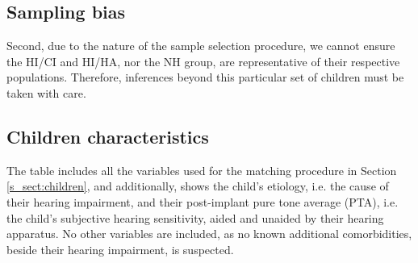 \subsection{Sampling bias}
%
Second, due to the nature of the sample selection procedure, we cannot ensure the HI/CI and HI/HA, nor the NH group, are representative of their respective populations. Therefore, inferences beyond this particular set of children must be taken with care.
%
%

\subsection{Children characteristics} \label{appA:char}
%
The table includes all the variables used for the matching procedure in Section \ref{s_sect:children}, and additionally, shows the child's etiology, i.e. the cause of their hearing impairment, and their post-implant pure tone average (PTA), i.e. the child's subjective hearing sensitivity, aided and unaided by their hearing apparatus. No other variables are included, as no known additional comorbidities, beside their hearing impairment, is suspected.

